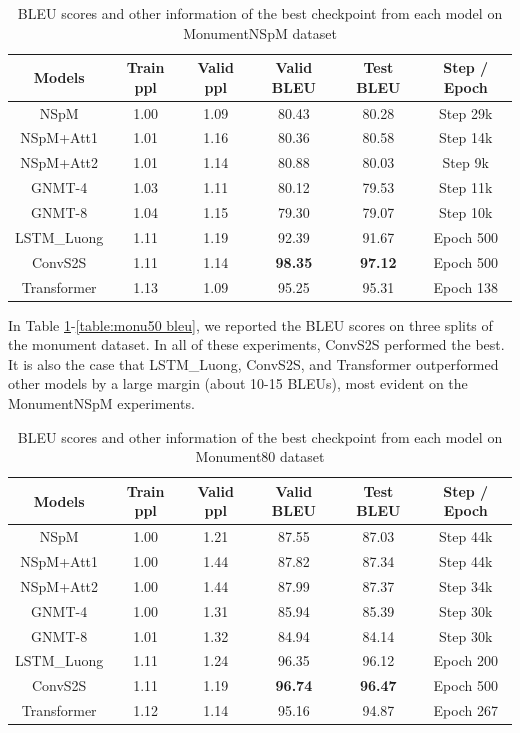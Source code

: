 \begin{table}[H]
\centering
\caption{BLEU scores and other information of the best checkpoint from each model on MonumentNSpM dataset}
\label{table:monu600 bleu}
\begin{tabular}{c|c|c|c|c|c}
Models & Train ppl & Valid ppl & \textbf{Valid BLEU} & \textbf{Test BLEU} & Step / Epoch \\
\hline
NSpM & 1.00 & 1.09 & 80.43 & 80.28 & Step 29k \\
NSpM+Att1 & 1.01 & 1.16 & 80.36 & 80.58 & Step 14k \\
NSpM+Att2 & 1.01 & 1.14 & 80.88 & 80.03 & Step 9k \\
GNMT-4 & 1.03 & 1.11 & 80.12 & 79.53 & Step 11k \\
GNMT-8 & 1.04 & 1.15 & 79.30 & 79.07 & Step 10k \\
LSTM\_Luong & 1.11 & 1.19 & 92.39 & 91.67 & Epoch 500 \\
ConvS2S & 1.11 & 1.14 & \textbf{98.35} & \textbf{97.12} & Epoch 500 \\
Transformer & 1.13 & 1.09 & 95.25 & 95.31 & Epoch 138 \\
\end{tabular}
\end{table}

In Table \ref{table:monu600 bleu}-\ref{table:monu50 bleu}, we reported the BLEU scores on three splits of the monument dataset. In all of these experiments, ConvS2S performed the best. It is also the case that LSTM\_Luong, ConvS2S, and Transformer outperformed other models by a large margin (about 10-15 BLEUs), most evident on the MonumentNSpM experiments.

\begin{table}[H]
\centering
\caption{BLEU scores and other information of the best checkpoint from each model on Monument80 dataset}
\label{table:monu80 bleu}
\begin{tabular}{c|c|c|c|c|c}
Models & Train ppl & Valid ppl & \textbf{Valid BLEU} & \textbf{Test BLEU} & Step / Epoch \\
\hline
NSpM & 1.00 & 1.21 & 87.55 & 87.03 & Step 44k \\
NSpM+Att1 & 1.00 & 1.44 & 87.82 & 87.34 & Step 44k \\
NSpM+Att2 & 1.00 & 1.44 & 87.99 & 87.37 & Step 34k \\
GNMT-4 & 1.00 & 1.31 & 85.94 & 85.39 & Step 30k \\
GNMT-8 & 1.01 & 1.32 & 84.94 & 84.14 & Step 30k \\
LSTM\_Luong & 1.11 & 1.24 & 96.35 & 96.12 & Epoch 200 \\
ConvS2S & 1.11 & 1.19 & \textbf{96.74} & \textbf{96.47} & Epoch 500 \\
Transformer & 1.12 & 1.14 & 95.16 & 94.87 & Epoch 267 \\
\end{tabular}
\end{table}


